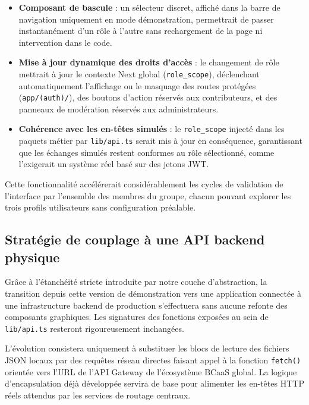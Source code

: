 \documentclass[12pt,a4paper]{report}
\begin{document}
\begin{itemize}
    \item \textbf{Composant de bascule} : un sélecteur discret, affiché dans la barre de navigation uniquement en mode démonstration, permettrait de passer instantanément d'un rôle à l'autre sans rechargement de la page ni intervention dans le code.
    
    \item \textbf{Mise à jour dynamique des droits d'accès} : le changement de rôle mettrait à jour le contexte Next global (\texttt{role\_scope}), déclenchant automatiquement l'affichage ou le masquage des routes protégées (\texttt{app/(auth)/}), des boutons d'action réservés aux contributeurs, et des panneaux de modération réservés aux administrateurs.
    
    \item \textbf{Cohérence avec les en-têtes simulés} : le \texttt{role\_scope} injecté dans les paquets métier par \texttt{lib/api.ts} serait mis à jour en conséquence, garantissant que les échanges simulés restent conformes au rôle sélectionné, comme l'exigerait un système réel basé sur des jetons JWT.
\end{itemize}

Cette fonctionnalité accélérerait considérablement les cycles de validation de l'interface par l'ensemble des membres du groupe, chacun pouvant explorer les trois profils utilisateurs sans configuration préalable.

\subsection{Stratégie de couplage à une API backend physique}

Grâce à l'étanchéité stricte introduite par notre couche d'abstraction, la transition depuis cette version de démonstration vers une application connectée à une infrastructure backend de production s'effectuera sans aucune refonte des composants graphiques. Les signatures des fonctions exposées au sein de \texttt{lib/api.ts} resteront rigoureusement inchangées.

L'évolution consistera uniquement à substituer les blocs de lecture des fichiers JSON locaux par des requêtes réseau directes faisant appel à la fonction \texttt{fetch()} orientée vers l'URL de l'API Gateway de l'écosystème BCaaS global. La logique d'encapsulation déjà développée servira de base pour alimenter les en-têtes HTTP réels attendus par les services de routage centraux.
\end{document}
